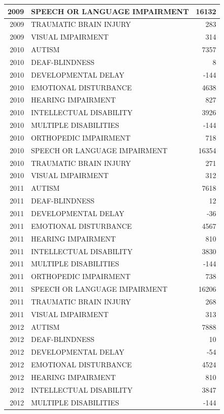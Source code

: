 \documentclass[
  english,
  man]{apa6}
\begin{document}
\begin{tabular}{r|l|r}
\hline
2009 & SPEECH OR LANGUAGE IMPAIRMENT & 16132\\
\hline
2009 & TRAUMATIC BRAIN INJURY & 283\\
\hline
2009 & VISUAL IMPAIRMENT & 314\\
\hline
2010 & AUTISM & 7357\\
\hline
2010 & DEAF-BLINDNESS & 8\\
\hline
2010 & DEVELOPMENTAL DELAY & -144\\
\hline
2010 & EMOTIONAL DISTURBANCE & 4638\\
\hline
2010 & HEARING IMPAIRMENT & 827\\
\hline
2010 & INTELLECTUAL DISABILITY & 3926\\
\hline
2010 & MULTIPLE DISABILITIES & -144\\
\hline
2010 & ORTHOPEDIC IMPAIRMENT & 718\\
\hline
2010 & SPEECH OR LANGUAGE IMPAIRMENT & 16354\\
\hline
2010 & TRAUMATIC BRAIN INJURY & 271\\
\hline
2010 & VISUAL IMPAIRMENT & 312\\
\hline
2011 & AUTISM & 7618\\
\hline
2011 & DEAF-BLINDNESS & 12\\
\hline
2011 & DEVELOPMENTAL DELAY & -36\\
\hline
2011 & EMOTIONAL DISTURBANCE & 4567\\
\hline
2011 & HEARING IMPAIRMENT & 810\\
\hline
2011 & INTELLECTUAL DISABILITY & 3830\\
\hline
2011 & MULTIPLE DISABILITIES & -144\\
\hline
2011 & ORTHOPEDIC IMPAIRMENT & 738\\
\hline
2011 & SPEECH OR LANGUAGE IMPAIRMENT & 16206\\
\hline
2011 & TRAUMATIC BRAIN INJURY & 268\\
\hline
2011 & VISUAL IMPAIRMENT & 313\\
\hline
2012 & AUTISM & 7888\\
\hline
2012 & DEAF-BLINDNESS & 10\\
\hline
2012 & DEVELOPMENTAL DELAY & -54\\
\hline
2012 & EMOTIONAL DISTURBANCE & 4524\\
\hline
2012 & HEARING IMPAIRMENT & 810\\
\hline
2012 & INTELLECTUAL DISABILITY & 3847\\
\hline
2012 & MULTIPLE DISABILITIES & -144\\

\end{tabular}
\end{document}
